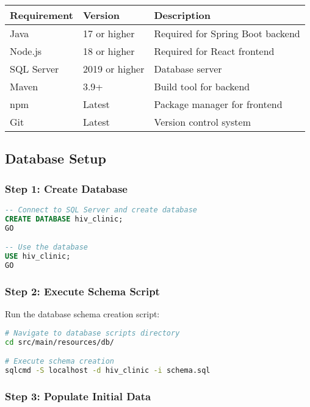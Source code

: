 \documentclass[12pt,a4paper]{article}
\begin{document}
\begin{longtable}{|p{3cm}|p{3cm}|p{8cm}|}
\hline
\textbf{Requirement} & \textbf{Version} & \textbf{Description} \\
\hline
Java & 17 or higher & Required for Spring Boot backend \\
\hline
Node.js & 18 or higher & Required for React frontend \\
\hline
SQL Server & 2019 or higher & Database server \\
\hline
Maven & 3.9+ & Build tool for backend \\
\hline
npm & Latest & Package manager for frontend \\
\hline
Git & Latest & Version control system \\
\hline
\end{longtable}

\subsection{Database Setup}

\subsubsection{Step 1: Create Database}

\begin{lstlisting}[language=SQL, caption=Database Creation]
-- Connect to SQL Server and create database
CREATE DATABASE hiv_clinic;
GO

-- Use the database
USE hiv_clinic;
GO
\end{lstlisting}

\subsubsection{Step 2: Execute Schema Script}

Run the database schema creation script:

\begin{lstlisting}[language=bash, caption=Schema Setup]
# Navigate to database scripts directory
cd src/main/resources/db/

# Execute schema creation
sqlcmd -S localhost -d hiv_clinic -i schema.sql
\end{lstlisting}

\subsubsection{Step 3: Populate Initial Data}
\end{document}
